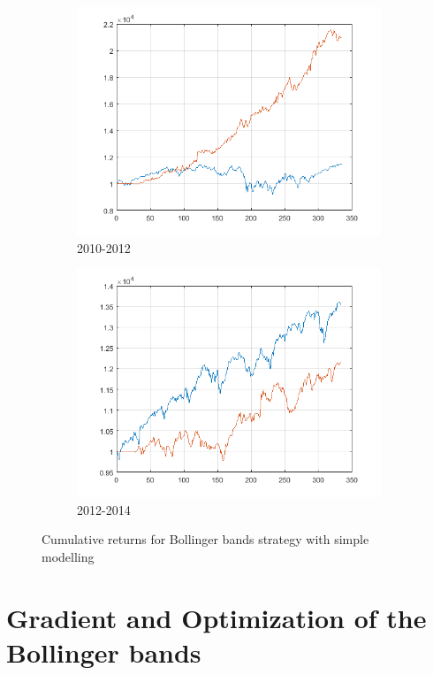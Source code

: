 \documentclass[11pt,a4,twosided,singlespacing,titlepagenumber=on]{scrreprt}
\numberwithin{equation}{chapter} %
\theoremstyle{remark}
\begin{document}
\begin{figure}[H]
\begin{subfigure}[t]{0.32\textwidth}
        \includegraphics[width=1\textwidth]{res/backtest_cpx/11}
        \caption{2010-2012}
    \end{subfigure}
    \begin{subfigure}[t]{0.32\textwidth}
        \centering
        \includegraphics[width=1\textwidth]{res/backtest_cpx/12}
        \caption{2012-2014}
    \end{subfigure}
    \caption[]{Cumulative returns for Bollinger bands strategy with simple modelling}
    \label{fig:bollinger_bands_strategy_simple}
\end{figure}

\section{Gradient and Optimization of the Bollinger bands}
\end{document}
